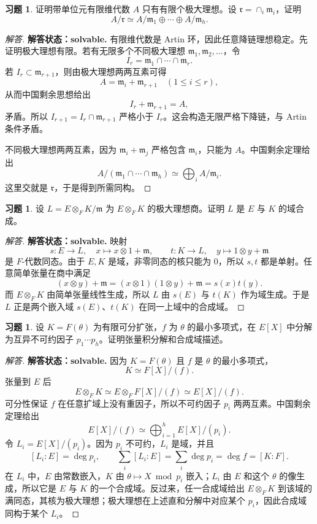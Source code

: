 \documentclass[11pt,a4paper,openany]{ctexbook}
\numberwithin{equation}{chapter}
\theoremstyle{plain}
\theoremstyle{definition}
\newtheorem{exercise}[theorem]{习题}
\theoremstyle{remark}
\begin{document}
\begin{exercise}
证明带单位元有限维代数 $A$ 只有有限个极大理想。设 $\mathfrak r=\cap_i\mathfrak m_i$，证明
\[
A/\mathfrak r\simeq A/\mathfrak m_1\oplus\cdots\oplus A/\mathfrak m_h.
\]
\end{exercise}

\begin{proof}[解答]
\textbf{解答状态：solvable.}
有限维代数是 Artin 环，因此任意降链理想稳定。先证明极大理想有限。若有无限多个不同极大理想
\(\mathfrak m_1,\mathfrak m_2,\dots\)，令
\[
I_r=\mathfrak m_1\cap\cdots\cap\mathfrak m_r.
\]
若 $I_r\subset \mathfrak m_{r+1}$，则由极大理想两两互素可得
\[
A=\mathfrak m_i+\mathfrak m_{r+1}\quad(1\le i\le r),
\]
从而中国剩余思想给出
\[
I_r+\mathfrak m_{r+1}=A,
\]
矛盾。所以 $I_{r+1}=I_r\cap\mathfrak m_{r+1}$ 严格小于 $I_r$。这会构造无限严格下降链，与 Artin 条件矛盾。

不同极大理想两两互素，因为 $\mathfrak m_i+\mathfrak m_j$ 严格包含
\(\mathfrak m_i\)，只能为 $A$。中国剩余定理给出
\[
A/(\mathfrak m_1\cap\cdots\cap\mathfrak m_h)
\simeq
\bigoplus_i A/\mathfrak m_i.
\]
这里交就是 $\mathfrak r$，于是得到所需同构。
\end{proof}

\begin{exercise}
设 $L=E\otimes_FK/\mathfrak m$ 为 $E\otimes_FK$ 的极大理想商。证明 $L$ 是 $E$ 与 $K$ 的域合成。
\end{exercise}

\begin{proof}[解答]
\textbf{解答状态：solvable.}
映射
\[
s:E\to L,\quad x\mapsto x\otimes1+\mathfrak m,\qquad
t:K\to L,\quad y\mapsto1\otimes y+\mathfrak m
\]
是 $F$-代数同态。由于 $E,K$ 是域，非零同态的核只能为 $0$，所以 $s,t$ 都是单射。任意简单张量在商中满足
\[
(x\otimes y)+\mathfrak m=(x\otimes1)(1\otimes y)+\mathfrak m=s(x)t(y).
\]
而 $E\otimes_FK$ 由简单张量线性生成，所以 $L$ 由 $s(E)$ 与 $t(K)$ 作为域生成。于是 $L$ 正是两个嵌入域 $s(E)$、$t(K)$ 在同一上域中的合成域。
\end{proof}

\begin{exercise}
设 $K=F(\theta)$ 为有限可分扩张，$f$ 为 $\theta$ 的最小多项式，在 $E[X]$ 中分解为互异不可约因子 $p_1\cdots p_h$。证明张量积分解和合成域描述。
\end{exercise}

\begin{proof}[解答]
\textbf{解答状态：solvable.}
因为 $K=F(\theta)$ 且 $f$ 是 $\theta$ 的最小多项式，
\[
K\simeq F[X]/(f).
\]
张量到 $E$ 后
\[
E\otimes_FK\simeq E\otimes_FF[X]/(f)\simeq E[X]/(f).
\]
可分性保证 $f$ 在任意扩域上没有重因子，所以不可约因子
$p_i$ 两两互素。中国剩余定理给出
\[
E[X]/(f)\simeq\bigoplus_{i=1}^hE[X]/(p_i).
\]
令 $L_i=E[X]/(p_i)$。因为 $p_i$ 不可约，$L_i$ 是域，并且
\[
[L_i:E]=\deg p_i,\qquad
\sum_i[L_i:E]=\sum_i\deg p_i=\deg f=[K:F].
\]
在 $L_i$ 中，$E$ 由常数嵌入，$K$ 由 $\theta\mapsto X\bmod p_i$ 嵌入；$L_i$ 由
$E$ 和这个 $\theta$ 的像生成，所以它是 $E$ 与 $K$ 的一个合成域。反过来，任一合成域给出
$E\otimes_FK$ 到该域的满同态，其核为极大理想；极大理想在上述直和分解中对应某个
$p_i$，因此合成域同构于某个 $L_i$。
\end{proof}
\end{document}
